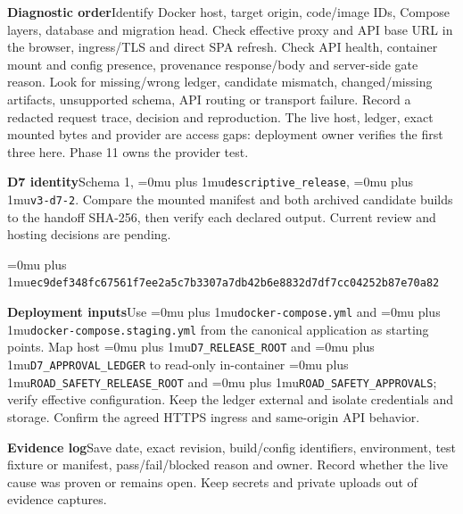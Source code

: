\documentclass[11pt,a4paper]{article}
\newcommand{\code}[1]{{\Urlmuskip=0mu plus 1mu\relax\nolinkurl{#1}}}
\newcommand{\lead}[2]{\textbf{#1}\enspace #2\par}
\begin{document}
\lead{Diagnostic order}{Identify Docker host, target origin, code/image IDs, Compose layers, database and migration head. Check effective proxy and API base URL in the browser, ingress/TLS and direct SPA refresh. Check API health, container mount and config presence, provenance response/body and server-side gate reason. Look for missing/wrong ledger, candidate mismatch, changed/missing artifacts, unsupported schema, API routing or transport failure. Record a redacted request trace, decision and reproduction. The live host, ledger, exact mounted bytes and provider are access gaps: deployment owner verifies the first three here. Phase 11 owns the provider test.}
\lead{D7 identity}{Schema 1, \code{descriptive_release}, \code{v3-d7-2}. Compare the mounted manifest and both archived candidate builds to the handoff SHA-256, then verify each declared output. Current review and hosting decisions are pending.}
\begin{center}\small\code{ec9def348fc67561f7ee2a5c7b3307a7db42b6e8832d7df7cc04252b87e70a82}\end{center}
\lead{Deployment inputs}{Use \code{docker-compose.yml} and \code{docker-compose.staging.yml} from the canonical application as starting points. Map host \code{D7_RELEASE_ROOT} and \code{D7_APPROVAL_LEDGER} to read-only in-container \code{ROAD_SAFETY_RELEASE_ROOT} and \code{ROAD_SAFETY_APPROVALS}; verify effective configuration. Keep the ledger external and isolate credentials and storage. Confirm the agreed HTTPS ingress and same-origin API behavior.}
\lead{Evidence log}{Save date, exact revision, build/config identifiers, environment, test fixture or manifest, pass/fail/blocked reason and owner. Record whether the live cause was proven or remains open. Keep secrets and private uploads out of evidence captures.}
\end{document}
